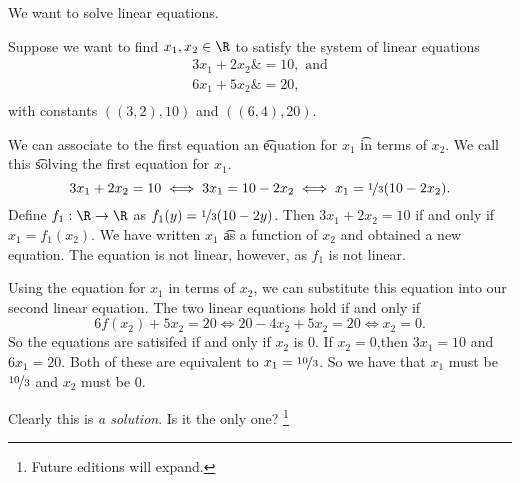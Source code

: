 
We want to solve linear equations.


Suppose we want to find $x_1, x_2 \in \R$ to satisfy the system of linear equations
  \[
\begin{aligned}
3x_1 + 2x_2 \&= 10, \text{ and} \\
6x_1 + 5x_2 \&= 20, \\
\end{aligned}
  \]
with constants $((3, 2), 10)$ and $((6, 4), 20)$.

We can associate to the first equation an \t{equation for} $x_1$ \t{in terms of} $x_2$.
We call this \t{solving the first equation for $x_1$}.
\[
3x_1 + 2x_2 = 10 \iff 3x_1 = 10 - 2x_2 \iff x_1 = \nicefrac{1}{3}(10 - 2x_2).
\]
Define $f_1: \R \to \R$ as $f_1(y) = \nicefrac{1}{3}(10 - 2y)$.
Then $3x_1 + 2x_2 = 10$ if and only if $x_1 = f_1(x_2)$.
We have written $x_1$ \t{as a function} of $x_2$ and obtained a new equation.
The equation is not linear, however, as $f_1$ is not linear.

Using the equation for $x_1$ in terms of $x_2$, we can substitute this equation into our second linear equation.
The two linear equations hold if and only if
  \[
6f(x_2) + 5x_2 = 20 \iff 20 - 4x_2 + 5x_2 = 20 \iff x_2 = 0.
  \]
So the equations are satisifed if and only if $x_2$ is $0$.
If $x_2 = 0$,then $3x_1 = 10$ and $6x_1 = 20$.
Both of these are equivalent to $x_1 = \nicefrac{10}{3}$.
So we have that $x_1$ must be $\nicefrac{10}{3}$ and $x_2$ must be 0.

Clearly this is \textit{a solution}.
Is it the only one?
  \ifhmode\unskip\fi\footnote{
Future editions will expand.
  }
